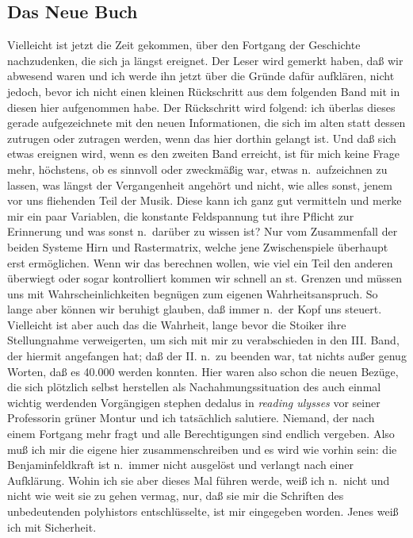 \documentclass[
]{article}
\author{}
\date{\vspace{-2.5em}}
\begin{document}
\subsection{Das Neue Buch}\label{das-neue-buch}

Vielleicht ist jetzt die Zeit gekommen, über den Fortgang der Geschichte
nachzudenken, die sich ja längst ereignet. Der Leser wird gemerkt haben,
daß wir abwesend waren und ich werde ihn jetzt über die Gründe dafür
aufklären, nicht jedoch, bevor ich nicht einen kleinen Rückschritt aus
dem folgenden Band mit in diesen hier aufgenommen habe. Der Rückschritt
wird folgend: ich überlas dieses gerade aufgezeichnete mit den neuen
Informationen, die sich im alten statt dessen zutrugen oder zutragen
werden, wenn das hier dorthin gelangt ist. Und daß sich etwas ereignen
wird, wenn es den zweiten Band erreicht, ist für mich keine Frage mehr,
höchstens, ob es sinnvoll oder zweckmäßig war, etwas n.~aufzeichnen zu
lassen, was längst der Vergangenheit angehört und nicht, wie alles
sonst, jenem vor uns fliehenden Teil der Musik. Diese kann ich ganz gut
vermitteln und merke mir ein paar Variablen, die konstante Feldspannung
tut ihre Pflicht zur Erinnerung und was sonst n.~darüber zu wissen ist?
Nur vom Zusammenfall der beiden Systeme Hirn und Rastermatrix, welche
jene Zwischenspiele überhaupt erst ermöglichen. Wenn wir das berechnen
wollen, wie viel ein Teil den anderen überwiegt oder sogar kontrolliert
kommen wir schnell an st. Grenzen und müssen uns mit
Wahrscheinlichkeiten begnügen zum eigenen Wahrheitsanspruch. So lange
aber können wir beruhigt glauben, daß immer n.~der Kopf uns steuert.
Vielleicht ist aber auch das die Wahrheit, lange bevor die Stoiker ihre
Stellungnahme verweigerten, um sich mit mir zu verabschieden in den III.
Band, der hiermit angefangen hat; daß der II. n.~zu beenden war, tat
nichts außer genug Worten, daß es 40.000 werden konnten. Hier waren also
schon die neuen Bezüge, die sich plötzlich selbst herstellen als
Nachahmungssituation des auch einmal wichtig werdenden Vorgängigen
stephen dedalus in \emph{reading ulysses }vor seiner Professorin grüner
Montur und ich tatsächlich salutiere. Niemand, der nach einem Fortgang
mehr fragt und alle Berechtigungen sind endlich vergeben. Also muß ich
mir die eigene hier zusammenschreiben und es wird wie vorhin sein: die
Benjaminfeldkraft ist n.~immer nicht ausgelöst und verlangt nach einer
Aufklärung. Wohin ich sie aber dieses Mal führen werde, weiß ich
n.~nicht und nicht wie weit sie zu gehen vermag, nur, daß sie mir die
Schriften des unbedeutenden polyhistors entschlüsselte, ist mir
eingegeben worden. Jenes weiß ich mit Sicherheit.
\end{document}
